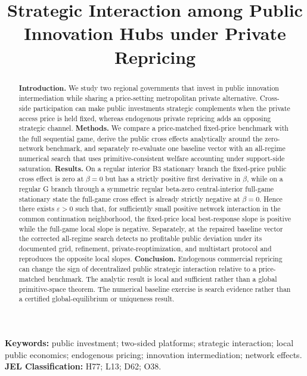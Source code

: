 \documentclass[11pt]{article}
\title{Strategic Interaction among Public Innovation Hubs under Private Repricing}
\author{}
\date{}
\begin{document}
\maketitle
\begin{abstract}
\textbf{Introduction.} We study two regional governments that invest in public innovation intermediation while sharing a price-setting metropolitan private alternative. Cross-side participation can make public investments strategic complements when the private access price is held fixed, whereas endogenous private repricing adds an opposing strategic channel. \textbf{Methods.} We compare a price-matched fixed-price benchmark with the full sequential game, derive the public cross effects analytically around the zero-network benchmark, and separately re-evaluate one baseline vector with an all-regime numerical search that uses primitive-consistent welfare accounting under support-side saturation. \textbf{Results.} On a regular interior B3 stationary branch the fixed-price public cross effect is zero at $\beta=0$ but has a strictly positive first derivative in $\beta$, while on a regular G branch through a symmetric regular beta-zero central-interior full-game stationary state the full-game cross effect is already strictly negative at $\beta=0$. Hence there exists $\varepsilon>0$ such that, for sufficiently small positive network interaction in the common continuation neighborhood, the fixed-price local best-response slope is positive while the full-game local slope is negative. Separately, at the repaired baseline vector the corrected all-regime search detects no profitable public deviation under its documented grid, refinement, private-reoptimization, and multistart protocol and reproduces the opposite local slopes. \textbf{Conclusion.} Endogenous commercial repricing can change the sign of decentralized public strategic interaction relative to a price-matched benchmark. The analytic result is local and sufficient rather than a global primitive-space theorem. The numerical baseline exercise is search evidence rather than a certified global-equilibrium or uniqueness result.
\end{abstract}
\noindent\textbf{Keywords:} public investment; two-sided platforms; strategic interaction; local public economics; endogenous pricing; innovation intermediation; network effects.\\
\noindent\textbf{JEL Classification:} H77; L13; D62; O38.











\end{document}
